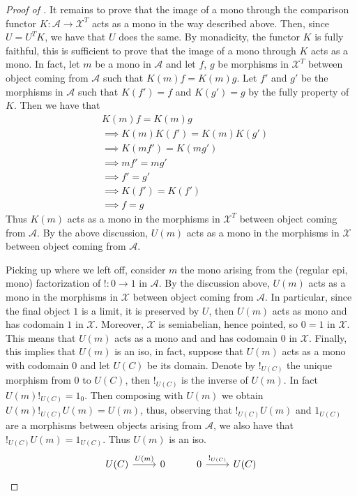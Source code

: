 \begin{subbox}{}
\begin{proof}[\textit{Proof of }]
    It remains to prove that the image of a mono through the comparison functor $K : \mathcal{A} \to \mathcal{X}^T$ acts as a mono in the way described above. Then, since $U=U^TK$, we have that $U$ does the same. By monadicity, the functor $K$ is fully faithful, this is sufficient to prove that the image of a mono through $K$ acts as a mono. In fact, let $m$ be a mono in $\mathcal{A}$ and let $f$, $g$ be morphisms in $\mathcal{X}^T$ between object coming from $\mathcal{A}$ such that $K(m)f = K(m)g$. Let $f'$ and $g'$ be the morphisms in $\mathcal{A}$ such that $K(f') = f$ and $K(g') = g$ by the fully property of $K$. Then we have that
    \begin{align*}
    &K(m)f = K(m)g\\[1.5ex]
    &\implies K(m) K(f') = K(m) K(g')\\[1.5ex]
    &\implies K(mf') = K(mg')\\[1.5ex]
    &\implies mf' = mg'\\[1.5ex]
    &\implies f' = g'\\[1.5ex]
    &\implies K(f') = K(f')\\[1.5ex]
    &\implies f = g
    \end{align*}
    Thus $K(m)$ acts as a mono in the morphisms in $\mathcal{X}^T$ between object coming from $\mathcal{A}$. By the above discussion, $U(m)$ acts as a mono in the morphisms in $\mathcal{X}$ between object coming from $\mathcal{A}$.

    Picking up where we left off, consider $m$ the mono arising from the (regular epi, mono) factorization of $!:0 \to 1$ in $\mathcal{A}$. By the discussion above, $U(m)$ acts as a mono in the morphisms in $\mathcal{X}$ between object coming from $\mathcal{A}$. In particular, since the final object $1$ is a limit, it is preserved by $U$, then $U(m)$ acts as mono and has codomain $1$ in $\mathcal{X}$. Moreover, $\mathcal{X}$ is semiabelian, hence pointed, so $0=1$ in $\mathcal{X}$. This means that $U(m)$ acts as a mono and and has codomain $0$ in $\mathcal{X}$. Finally, this implies that $U(m)$ is an iso, in fact, suppose that $U(m)$ acts as a mono with codomain $0$ and let $U(C)$ be its domain. Denote by $!_{U(C)}$ the unique morphism from $0$ to $U(C)$, then $!_{U(C)}$ is the inverse of $U(m)$. In fact $U(m)!_{U(C)}=1_0$. Then composing with $U(m)$ we obtain $U(m)!_{U(C)}U(m)=U(m)$, thus, observing that $!_{U(C)}U(m)$ and $1_{U(C)}$ are a morphisms between objects arising from $\mathcal{A}$, we also have that $!_{U(C)}U(m)=1_{U(C)}$. Thus $U(m)$ is an iso.
    \[
\begin{tikzcd}
U(C) \arrow[r, "U(m)"] & 0 & 0 \arrow[r, "!_{U(C)}"] & U(C)
\end{tikzcd}
    \]
    

\end{proof}
\end{subbox}
